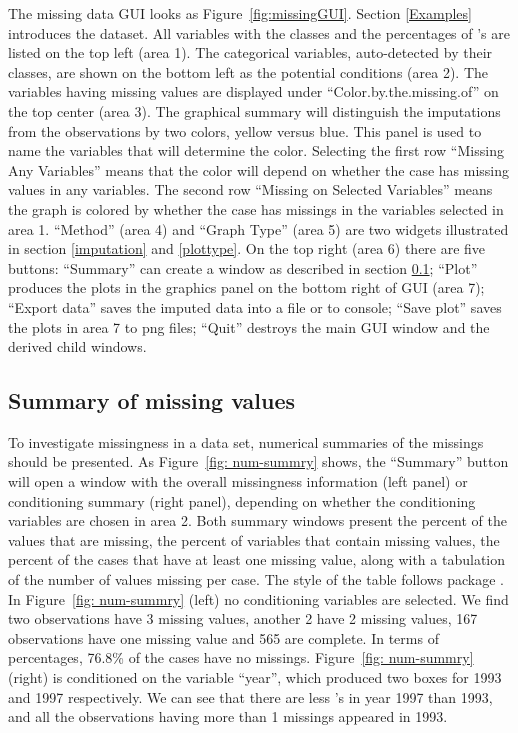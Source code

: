 \documentclass[article]{jss}
\begin{document}
The missing data GUI looks as Figure~\ref{fig:missingGUI}. Section \ref{Examples} introduces the dataset. All variables with the classes and the percentages of 's are listed on the top left (area 1). The categorical variables, auto-detected by their classes, are shown on the bottom left as the potential conditions (area 2). The variables having missing values are displayed under ``Color.by.the.missing.of'' on the top center (area 3). The graphical summary will distinguish the imputations from the observations by two colors, yellow versus blue. This panel is used to name the variables that will determine the color. Selecting the first row ``Missing Any Variables'' means that the color will depend on whether the case has missing values in any variables. The second row ``Missing on Selected Variables'' means the graph is colored by whether the case has missings in the variables selected in area 1. ``Method'' (area 4) and ``Graph Type'' (area 5) are two widgets illustrated in section \ref{imputation} and \ref{plottype}. On the top right (area 6) there are five buttons: ``Summary'' can create a window as described in section \ref{numsum}; ``Plot'' produces the plots in the graphics panel on the bottom right of GUI (area 7); ``Export data'' saves the imputed data into a file or to  console; ``Save plot'' saves the plots in area 7 to png files; ``Quit'' destroys the main GUI window and the derived child windows.

\subsection{Summary of missing values}\label{numsum}

To investigate missingness in a data set, numerical summaries of the missings should be presented. As Figure~\ref{fig: num-summry} shows, the ``Summary'' button will open a window with the overall missingness information (left panel) or conditioning summary (right panel), depending on whether the conditioning variables are chosen in area 2. Both summary windows present the percent of the values that are missing, the percent of variables that contain missing values, the percent of the cases that have at least one missing value, along with a tabulation of the number of values missing per case. The style of the table follows package .  In Figure~\ref{fig: num-summry} (left) no conditioning variables are selected. We find two observations have 3 missing values, another 2 have 2 missing values, 167 observations have one missing value and 565 are complete. In terms of percentages, 76.8\% of the cases have no missings. Figure~\ref{fig: num-summry} (right) is conditioned on the variable ``year'', which produced two boxes for 1993 and 1997 respectively. We can see that there are less 's in year 1997 than 1993, and all the observations having more than 1 missings appeared in 1993.
\end{document}
